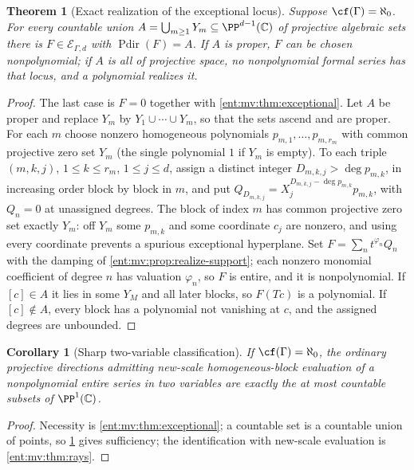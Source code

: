 \documentclass[11pt]{article}
\newtheorem{theorem}{Theorem}[section]
\theoremstyle{plain}
\theoremstyle{plain}
\theoremstyle{plain}
\newtheorem{corollary}[corollary]{Corollary}
\theoremstyle{definition}
\theoremstyle{definition}
\theoremstyle{definition}
\theoremstyle{definition}
\theoremstyle{remark}
\newcommand{\C}{\mathbb C}\newcommand{\R}{\mathbb R}
\DeclareMathOperator{\Pdir}{Pdir}\DeclareMathOperator{\Adm}{Adm}
\begin{document}
\begin{theorem}[Exact realization of the exceptional locus]
\label{ent:mv:thm:realization}
Suppose $\cf(\Gamma)=\aleph_0$. For every countable union
$A=\bigcup_{m\ge1}Y_m\subseteq\PP^{d-1}(\C)$ of projective algebraic sets
there is $F\in\mathcal E_{\Gamma,d}$ with $\Pdir(F)=A$. If $A$ is proper, $F$
can be chosen nonpolynomial; if $A$ is all of projective space, no
nonpolynomial formal series has that locus, and a polynomial realizes it.
\end{theorem}
\begin{proof}
The last case is $F=0$ together with \cref{ent:mv:thm:exceptional}. Let $A$ be
proper and replace $Y_m$ by $Y_1\cup\cdots\cup Y_m$, so that the sets ascend
and are proper. For each $m$ choose nonzero homogeneous polynomials
$p_{m,1},\ldots,p_{m,r_m}$ with common projective zero set $Y_m$ (the single
polynomial $1$ if $Y_m$ is empty). To each triple $(m,k,j)$, $1\le k\le r_m$,
$1\le j\le d$, assign a distinct integer $D_{m,k,j}>\deg p_{m,k}$, in
increasing order block by block in $m$, and put
$Q_{D_{m,k,j}}=X_j^{D_{m,k,j}-\deg p_{m,k}}p_{m,k}$, with $Q_n=0$ at unassigned
degrees. The block of index $m$ has common projective zero set exactly $Y_m$:
off $Y_m$ some $p_{m,k}$ and some coordinate $c_j$ are nonzero, and using every
coordinate prevents a spurious exceptional hyperplane. Set
$F=\sum_nt^{\varphi_n}Q_n$ with the damping of
\cref{ent:mv:prop:realize-support}; each nonzero monomial coefficient of
degree $n$ has valuation $\varphi_n$, so $F$ is entire, and it is
nonpolynomial. If $[c]\in A$ it lies in some $Y_M$ and all later blocks, so
$F(Tc)$ is a polynomial. If $[c]\notin A$, every block has a polynomial not
vanishing at $c$, and the assigned degrees are unbounded.
\end{proof}

\begin{corollary}[Sharp two-variable classification]\label{ent:mv:cor:countable}
If $\cf(\Gamma)=\aleph_0$, the ordinary projective directions admitting
new-scale homogeneous-block evaluation of a nonpolynomial entire series in two
variables are exactly the at most countable subsets of $\PP^1(\C)$.
\end{corollary}
\begin{proof}
Necessity is \cref{ent:mv:thm:exceptional}; a countable set is a countable
union of points, so \cref{ent:mv:thm:realization} gives sufficiency; the
identification with new-scale evaluation is \cref{ent:mv:thm:rays}.
\end{proof}
\end{document}
